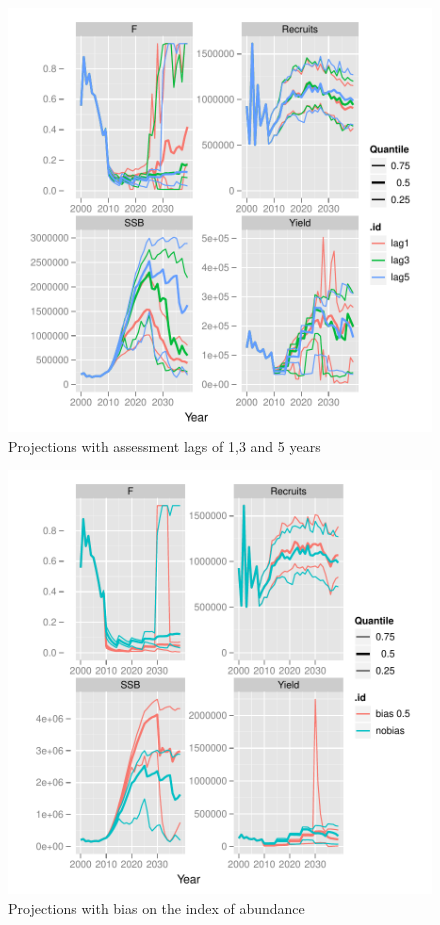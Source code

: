 \documentclass[a4paper]{article}
\begin{document}
\begin{figure}[H]
\centering
\includegraphics{MSE-004}
\caption{Projections with assessment lags of 1,3 and 5 years}
\label{fig:lags}
\end{figure}
 
\begin{figure}[H]
\centering
\includegraphics{MSE-005}
\caption{Projections with bias on the index of abundance}
\label{fig:srvBias}
\end{figure}
\end{document}
